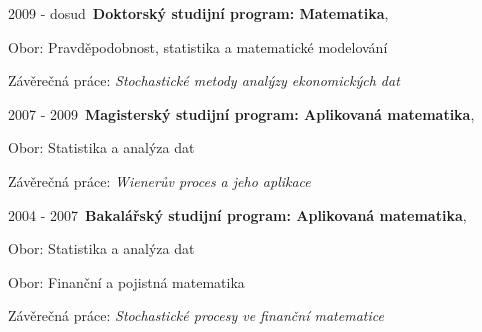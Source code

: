 \documentclass[10pt]{article}
\newenvironment{outerlist}[0]%
        {\begin{itemize}}
	{\end{itemize}
         \vspace{-.6\baselineskip}}
\newenvironment{innerlist}[0]%
        {\begin{compactitem}}
	{\end{compactitem}}
\begin{document}
\begin{outerlist}
   \item[] 2009 - dosud\ \textbf{Doktorský studijní program: Matematika},
	  \begin{innerlist}
	    \item[] Obor: Pravděpodobnost, statistika a matematické modelování
	    \item Závěrečná práce: \emph{Stochastické metody analýzy ekonomických dat} \hfill \\
	  \end{innerlist}

  \item[] 2007 - 2009\ \textbf{Magisterský studijní program: Aplikovaná matematika},
	  \begin{innerlist}
	    \item[] Obor: Statistika a analýza dat
	    \item Závěrečná práce: \emph{Wienerův proces a jeho aplikace} \hfill \\
             \end{innerlist}

  \item[] 2004 - 2007\ \textbf{Bakalářský studijní program: Aplikovaná matematika},
	  \begin{innerlist}
	    \item[] Obor: Statistika a analýza dat
               \item[] Obor: Finanční a pojistná matematika	    
               \item Závěrečná práce: \emph{Stochastické procesy ve finanční matematice} \hfill \\
             \end{innerlist}

\end{outerlist}
\end{document}
